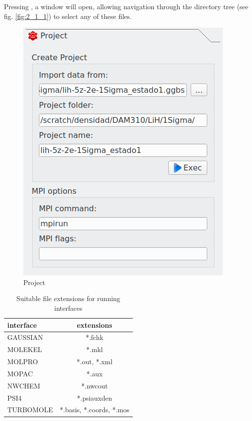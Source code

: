 \documentclass[10pt]{article}
\begin{document}
Pressing \teclapuntos, a window will open, allowing navigation through the directory tree
(see fig. \ref{fig:2_1_1}) to select any of these files.


\vspace*{5mm}

\begin{minipage}{.35\linewidth}
\vspace*{-2mm}
\begin{figure}[H]
\vspace*{-3mm}
\begin{center}
\includegraphics[width=.7\linewidth]{damqt320_project_menu.png}
\end{center}
\caption{Project \label{fig:2_1_2}}
\end{figure}
\end{minipage}
\hspace*{1cm}
\vspace*{5mm}
\begin{minipage}{.45\linewidth}
\begin{table}[H]
\begin{center}
\caption{\label{tab:2.1}Suitable file extensions for running interfaces}
\begin{tabular}{l|c}
interface & extensions \\
\hline
GAUSSIAN & *.fchk \\
MOLEKEL & *.mkl \\
MOLPRO & *.out, *.xml \\
MOPAC & *.aux \\
NWCHEM & *.nwcout \\
PSI4 & *.psiauxden \\
TURBOMOLE & *.basis, *.coords, *.mos \\
\hline
\end{tabular}
\end{center}
\end{table}
\end{minipage}
\end{document}
